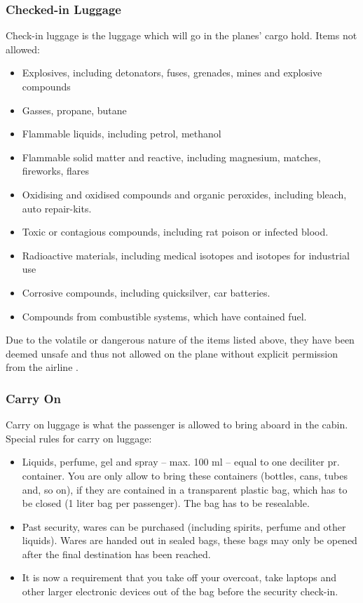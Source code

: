 \subsubsection{Checked-in Luggage}
Check-in luggage is the luggage which will go in the planes' cargo hold.
\newline 
Items not allowed:
\begin{itemize}
\item Explosives, including detonators, fuses, grenades, mines and explosive compounds
\item Gasses, propane, butane
\item Flammable liquids, including petrol, methanol
\item Flammable solid matter and reactive, including magnesium, matches, fireworks, flares
\item Oxidising and oxidised compounds and organic peroxides, including bleach, auto repair-kits.
\item Toxic or contagious compounds, including rat poison or infected blood.
\item Radioactive materials, including medical isotopes and isotopes for industrial use
\item Corrosive compounds, including quicksilver, car batteries.
\item Compounds from combustible systems, which have contained fuel.
\end{itemize}
Due to the volatile or dangerous nature of the items listed above, they have been deemed unsafe and thus not allowed on the plane without explicit permission from the airline \citep{DangerousGoods}.

\subsubsection{Carry On}
Carry on luggage is what the passenger is allowed to bring aboard in the cabin.
\newline
Special rules for carry on luggage:
\begin{itemize}
\item Liquids, perfume, gel and spray – max. 100 ml – equal to one deciliter pr. container. You are only allow to bring these containers (bottles, cans, tubes and, so on), if they are contained in a transparent plastic bag, which has to be closed (1 liter bag per passenger). The bag has to be resealable.
\item Past security, wares can be purchased (including spirits, perfume and other liquids). Wares are handed out in sealed bags, these bags may only be opened after the final destination has been reached.
\item It is now a requirement that you take off your overcoat, take laptops and other larger electronic devices out of the bag before the security check-in.
\citep{Prohibited_luggage}
\end{itemize}

